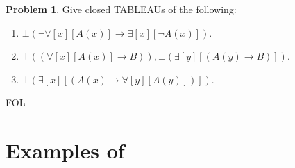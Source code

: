 \documentclass[10pt,a4paper]{article}
\newcommand*{\olup}[1]{\MakeUppercase{#1}}
\theoremstyle{plain}
\theoremstyle{definition}
\newtheorem{prob}{Problem}[section]
\theoremstyle{remark}
\newcommand*{\olfileid}[3]{}
\newcommand*{\olsection}[1]{\section*{#1}}
\providecommand{\lif}{\mathbin{\rightarrow}}
\providecommand{\lforall}{\mathord{\forall}}
\providecommand{\lexists}{\mathord{\exists}}
\providecommand{\sFmla}[2]{#1(#2)}
\providecommand{\True}{\top}
\providecommand{\False}{\bot}
\providecommand{\iftag}[1]{#1}
\providecommand{\iftag}{}
\begin{document}
\begin{prob}
Give closed \olup{tableau}s of the following:
\begin{enumerate}
\item $\sFmla{\False}{\lnot\lforall[x][A(x)] \lif \lexists[x][\lnot A(x)]}$.
\item $\sFmla{\True}{(\lforall[x][A(x)] \lif B)}, \sFmla{\False}{\lexists[y][(A(y) \lif B)]}$.
\item $\sFmla{\False}{\lexists[x][(A(x) \lif \lforall[y][A(y)])]}$.
\end{enumerate}
\end{prob}





\iftag{FOL}
      {\olfileid{fol}{tab}{pro}}
      {\olfileid{pl}{tab}{pro}}

\olsection{Examples of }
\end{document}
